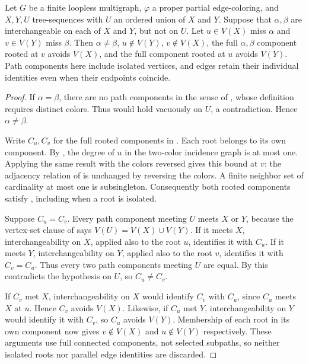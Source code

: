 \begin{helper}
Let $G$ be a finite loopless multigraph, $\varphi$ a proper partial
edge-coloring, and $X,Y,U$ tree-sequences with $U$ an ordered union of
$X$ and $Y$. Suppose that $\alpha,\beta$ are interchangeable on each
of $X$ and $Y$, but not on $U$. Let $u\in V(X)$ miss $\alpha$ and
$v\in V(Y)$ miss $\beta$. Then $\alpha\ne\beta$, $u\notin V(Y)$,
$v\notin V(X)$, the full $\alpha,\beta$ component rooted at $v$
avoids $V(X)$, and the full component rooted at $u$ avoids $V(Y)$.
Path components here include isolated vertices, and edges retain their
individual identities even when their endpoints coincide.
\end{helper}
\begin{proof}
If $\alpha=\beta$, there are no path components in the sense of
, whose definition requires distinct
colors. Thus  would hold vacuously on $U$,
a contradiction. Hence $\alpha\ne\beta$.

Write $C_u,C_v$ for the full rooted components in
. Each root belongs to its own component.
By , the degree of $u$ in the
two-color incidence graph is at most one. Applying the same result with
the colors reversed gives this bound at $v$: the adjacency relation of
 is unchanged by reversing the colors.
A finite neighbor set of cardinality at most one is subsingleton.
Consequently both rooted components satisfy
, including when a root is isolated.

Suppose $C_u=C_v$. Every path component meeting $U$ meets $X$ or $Y$,
because the vertex-set clause of  says
$V(U)=V(X)\cup V(Y)$. If it meets $X$, interchangeability on $X$,
applied also to the root $u$, identifies it with $C_u$. If it meets
$Y$, interchangeability on $Y$, applied also to the root $v$,
identifies it with $C_v=C_u$. Thus every two path components meeting
$U$ are equal. By  this contradicts the
hypothesis on $U$, so $C_u\ne C_v$.

If $C_v$ met $X$, interchangeability on $X$ would identify $C_v$ with
$C_u$, since $C_u$ meets $X$ at $u$. Hence $C_v$ avoids $V(X)$.
Likewise, if $C_u$ met $Y$, interchangeability on $Y$ would identify it
with $C_v$, so $C_u$ avoids $V(Y)$. Membership of each root in its own
component now gives $v\notin V(X)$ and $u\notin V(Y)$ respectively.
These arguments use full connected components, not selected subpaths,
so neither isolated roots nor parallel edge identities are discarded.
\end{proof}

